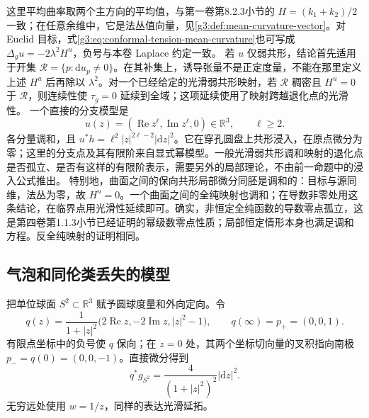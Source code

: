 这里平均曲率取两个主方向的平均值，与第一卷第8.2.3小节的 \(H=(k_1+k_2)/2\) 一致；在任意余维中，它是法丛值向量，见\cref{g3:def:mean-curvature-vector}。对 Euclid 目标，式\eqref{g3:eq:conformal-tension-mean-curvature}也可写成
\(\Delta_g u=-2\lambda^2H^u\)，负号与本卷 Laplace 约定一致。
\ProseParagraphBreak
若 \(u\) 仅弱共形，结论首先适用于开集
\(\mathcal R=\{p:\mathrm du_p\ne0\}\)。在其补集上，诱导张量不是正定度量，不能在那里定义上述 \(H^u\) 后再除以 \(\lambda^2\)。对一个已经给定的光滑弱共形映射，若 \(\mathcal R\) 稠密且 \(H^u=0\) 于 \(\mathcal R\)，则连续性使 \(\tau_g=0\) 延续到全域；这项延续使用了映射跨越退化点的光滑性。
\ProseParagraphBreak
一个直接的分支模型是
\[
	u(z)=(\operatorname{Re}z^\ell,\operatorname{Im}z^\ell,0)
	\in\mathbb R^3,\qquad \ell\ge2.
\]
各分量调和，且 \(u^*h=\ell^2|z|^{2\ell-2}|\mathrm dz|^2\)。它在穿孔圆盘上共形浸入，在原点微分为零；这里的分支点及其有限阶来自显式幂模型。一般光滑弱共形调和映射的退化点是否孤立、是否有这样的有限阶表示，需要另外的局部理论，不由前一命题中的浸入公式推出。
\ProseParagraphBreak
特别地，曲面之间的保向共形局部微分同胚是调和的：目标与源同维，法丛为零，故 \(H^u=0\)。一个曲面之间的全纯映射也调和；在导数非零处用这条结论，在临界点用光滑性延续即可。确实，非恒定全纯函数的导数零点孤立，这是第四卷第1.1.3小节已经证明的幂级数零点性质；局部恒定情形本身也满足调和方程。反全纯映射的证明相同。

\subsection{气泡和同伦类丢失的模型}
\label{g3:subsec:1804:04}
把单位球面 \(S^2\subset\mathbb R^3\) 赋予圆球度量和外向定向。令
\begin{equation}\label{g3:eq:sphere-stereographic-parametrization}
	q(z)=\frac1{1+|z|^2}
	\bigl(2\operatorname{Re}z,-2\operatorname{Im}z,|z|^2-1\bigr),
	\qquad q(\infty)=p_+=(0,0,1).
\end{equation}
有限点坐标中的负号使 \(q\) 保向；在 \(z=0\) 处，其两个坐标切向量的叉积指向南极
\(p_-=q(0)=(0,0,-1)\)。直接微分得到
\[
	q^*g_{S^2}=\frac4{(1+|z|^2)^2}|\mathrm dz|^2.
\]
无穷远处使用 \(w=1/z\)，同样的表达光滑延拓。


